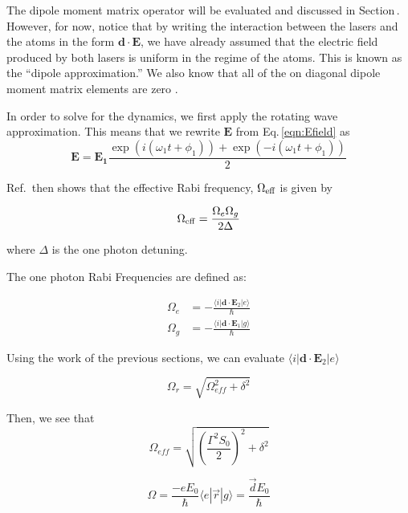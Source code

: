 The dipole moment matrix operator will be evaluated and discussed in Section\,\label{ElectricDipoleInteraction}. However, for now, notice that by writing the interaction between the lasers and the atoms in the form $\mathbf{d}\cdot\mathbf{E}$, we have already assumed that the electric field produced by both lasers is uniform in the regime of the atoms. This is known as the ``dipole approximation.'' We also know that all of the on diagonal dipole moment matrix elements are zero \cite{cohenTannoudji}.

In order to solve for the dynamics, we first apply the rotating wave approximation. This means that we rewrite $\mathbf{E}$ from Eq.\,\ref{eqn:Efield} as 
\begin{equation}
\mathbf{E}=\mathbf{E_1}\frac{\exp(i (\omega_1 t + \phi_1))+\exp(-i(\omega_1 t +\phi_1))}{2}
\end{equation}

Ref.\,\cite{Young1997363} then shows that the effective Rabi frequency, $\Omega_{\textnormal{eff}}$ is given by 

\begin{equation}
\Omega_{\rm eff}=\frac{\Omega_{e} \Omega_{g}}{2 \Delta}
\end{equation}

where $\Delta$ is the one photon detuning. %

The one photon Rabi Frequencies are defined as:

\begin{align}
\Omega_e&=-\frac{\langle i | \mathbf{d}\cdot \mathbf{E}_2 | e\rangle }{\hbar}\\
\Omega_g&=-\frac{\langle i | \mathbf{d}\cdot \mathbf{E}_1 | g\rangle}{\hbar}
\end{align}

Using the work of the previous sections, we can evaluate $\langle i | \mathbf{d}\cdot \mathbf{E}_2 | e\rangle$

\begin{equation}
\Omega_\mathit{r}=\sqrt{\Omega_\mathit{eff}^2+\delta^2}
\end{equation}

Then, we see that 
\begin{equation}
\Omega_\mathit{eff}=\sqrt{\left(\frac{\Gamma^2S_0}{2}\right)^2 + \delta^2}
\end{equation}

\begin{equation}
\Omega = \frac{-eE_0}{\hbar}\langle e |\vec{r}|g\rangle=\frac{\vec{d}E_0}{\hbar}
\end{equation}

